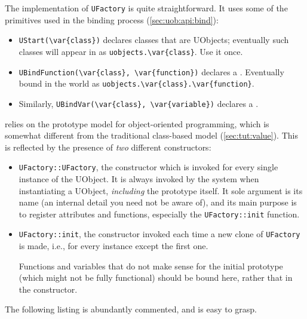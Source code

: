 

The implementation of \lstinline|UFactory| is quite straightforward.  It
uses some of the primitives used in the binding process
(\autoref{sec:uob:api:bind}):
\begin{itemize}
\item \lstinline|UStart(\var{class})| declares classes that are UObjects;
  eventually such classes will appear in \us as
  \lstinline|uobjects.\var{class}|.  Use it once.

\item \lstinline|UBindFunction(\var{class}, \var{function})| declares a
  .  Eventually bound in the \us world as
  \lstinline|uobjects.\var{class}.\var{function}|.

\item Similarly, \lstinline|UBindVar(\var{class}, \var{variable})| declares
  a .
\end{itemize}

\urbi relies on the prototype model for object-oriented programming, which
is somewhat different from the traditional \Cxx class-based model
(\autoref{sec:tut:value}).  This is reflected by the presence of \emph{two}
different constructors:
\begin{itemize}
\item \lstinline|UFactory::UFactory|, the \Cxx constructor which is invoked
  for every single instance of the UObject.  It is always invoked by the
  \urbi system when instantiating a UObject, \emph{including} the prototype
  itself.  It sole argument is its name (an internal detail you need not be
  aware of), and its main purpose is to register attributes and functions,
  especially the \lstinline|UFactory::init| function.

\item \lstinline|UFactory::init|, the \urbi constructor invoked each time a
  new clone of \lstinline|UFactory| is made, i.e., for every instance except
  the first one.

  Functions and variables that do not make sense for the initial prototype
  (which might not be fully functional) should be bound here, rather that in
  the \Cxx constructor.
\end{itemize}

The following listing is abundantly commented, and is easy to grasp.



